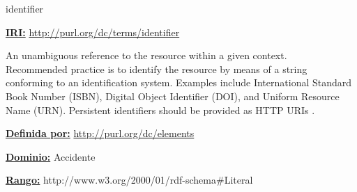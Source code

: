 \begin{mybox}{identifier}
\begin{flushleft}
\underline{\textbf{IRI:}}
\url{http://purl.org/dc/terms/identifier}
\newline

An unambiguous reference to the resource within a given context.
\\Recommended practice is to identify the resource by means of a string conforming to an identification system. Examples include International Standard Book Number (ISBN), Digital Object Identifier (DOI), and Uniform Resource Name (URN). Persistent identifiers should be provided as HTTP URIs \cite{dc_identifier}.
\newline

\underline{\textbf{Definida por:}}\newline
\url{http://purl.org/dc/elements}
\newline

\underline{\textbf{Dominio:}} 	Accidente
\newline

\underline{\textbf{Rango:}}\newline
	http://www.w3.org/2000/01/rdf-schema\#Literal
\newline

\end{flushleft}
\end{mybox}






